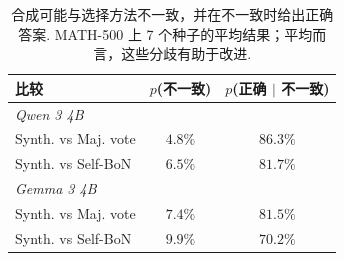 \begin{longtable}{lcc}
\caption{合成可能与选择方法不一致，并在不一致时给出正确答案. MATH-500 上 7 个种子的平均结果；平均而言，这些分歧有助于改进.}\label{cat-tab:disagreement}\\

        \toprule
        \textbf{比较} & $p$(不一致) & $p$(正确 $\mid$ 不一致) \\
        \midrule
        \multicolumn{3}{l}{\textit{Qwen 3 4B}} \\
        Synth. vs Maj. vote & $4.8\%$ & $\mathbf{86.3\%}$ \\
        Synth. vs Self-BoN & $6.5\%$ & $\mathbf{81.7\%}$ \\
        \midrule
        \multicolumn{3}{l}{\textit{Gemma 3 4B}} \\
        Synth. vs Maj. vote & $7.4\%$ & $\mathbf{81.5\%}$ \\
        Synth. vs Self-BoN & $9.9\%$ & $\mathbf{70.2\%}$ \\
        \bottomrule
    
\end{longtable}
